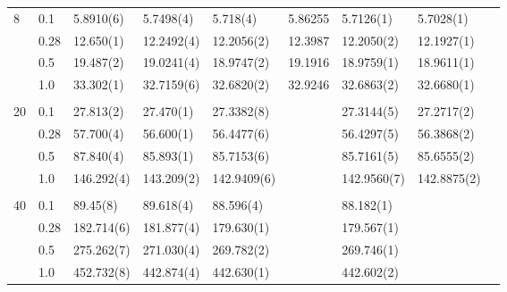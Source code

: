 {\begin{landscape}
\begin{table}
\begin{tabularx}{\hsize}{llR{2.65cm}R{2.65cm}R{2.65cm}R{2.65cm}R{2.65cm}R{2.65cm}R{2.65cm}}
				8 & 0.1 & 5.8910(6) & 5.7498(4) & 5.718(4) & 5.86255 & 5.7126(1) & 5.7028(1) \\ 
				& 0.28 & 12.650(1) & 12.2492(4) & 12.2056(2) & 12.3987 & 12.2050(2) & 12.1927(1) \\
				& 0.5 & 19.487(2) & 19.0241(4) & 18.9747(2) & 19.1916 & 18.9759(1) & 18.9611(1) \\
				& 1.0 & 33.302(1) & 32.7159(6) & 32.6820(2) & 32.9246 & 32.6863(2) & 32.6680(1) \\ 
				\hline \\
				
				20 & 0.1 & 27.813(2) & 27.470(1) & 27.3382(8) & & 27.3144(5) & 27.2717(2) \\ 
				& 0.28 & 57.700(4) & 56.600(1) & 56.4477(6) & & 56.4297(5) & 56.3868(2) \\
				& 0.5 & 87.840(4) & 85.893(1) & 85.7153(6) & & 85.7161(5) & 85.6555(2) \\
				& 1.0 & 146.292(4) & 143.209(2) & 142.9409(6) & & 142.9560(7) & 142.8875(2) \\ \hline \\
				
				40 & 0.1 & 89.45(8) & 89.618(4) & 88.596(4) & & 88.182(1) \\ 
				& 0.28 & 182.714(6) & 181.877(4) & 179.630(1) & & 179.567(1) \\
				& 0.5 & 275.262(7) & 271.030(4) & 269.782(2) & & 269.746(1) \\
				& 1.0 & 452.732(8) & 442.874(4) & 442.630(1) & & 442.602(2) \\ \hline\hline
			\end{tabularx}
		\end{table}
	\end{landscape}
}

